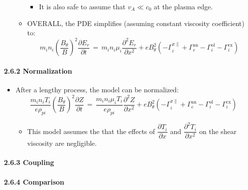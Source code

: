 \documentclass[]{article}
\providecommand{\tightlist}{%
  \setlength{\itemsep}{0pt}\setlength{\parskip}{0pt}}
\let\oldparagraph\paragraph
\renewcommand{\paragraph}[1]{\oldparagraph{#1}\mbox{}}
\begin{document}
\begin{itemize}
\begin{itemize}
    \begin{itemize}
    \tightlist
    \item
      It is also safe to assume that \(v_A \ll c_0\) at the plasma edge.
    \end{itemize}
  \item
    OVERALL, the PDE simplifies (assuming constant viscosity
    coefficient) to:
    \[m_i n_i \left(\frac{B_\theta}{B}\right)^2 \frac{\partial E_r}{\partial t} \,=\, m_i n_i \mu_i \frac{\partial^2 E_r}{\partial x^2} + e B_\theta^2 \left(-\Gamma_i^{\pi \parallel} + \Gamma_e^\text{an} - \Gamma_i^\text{ol} - \Gamma_i^\text{cx}\right)\]
  \end{itemize}
\end{itemize}

\paragraph{2.6.2 Normalization}\label{normalization}

\begin{itemize}
\item
  After a lengthy process, the model can be normalized:
  \[\frac{m_i n_i T_i}{e \rho_{pi}} \left(\frac{B_\theta}{B}\right)^2 \frac{\partial Z}{\partial t} \,=\, \frac{m_i n_i \mu_i T_i}{e \rho_{pi}} \frac{\partial^2 Z}{\partial x^2} + e B_\theta^2 \left(-\Gamma_i^{\pi \parallel} + \Gamma_e^\text{an} - \Gamma_i^\text{ol} - \Gamma_i^\text{cx}\right)\]

  \begin{itemize}
  \tightlist
  \item
    This model assumes the that the effects of
    \(\dfrac{\partial T_i}{\partial x}\) and
    \(\dfrac{\partial^2 T_i}{\partial x^2}\) on the shear viscosity are
    negligible.
  \end{itemize}
\end{itemize}

\paragraph{2.6.3 Coupling}\label{coupling}

\paragraph{2.6.4 Comparison}\label{comparison}
\end{document}
